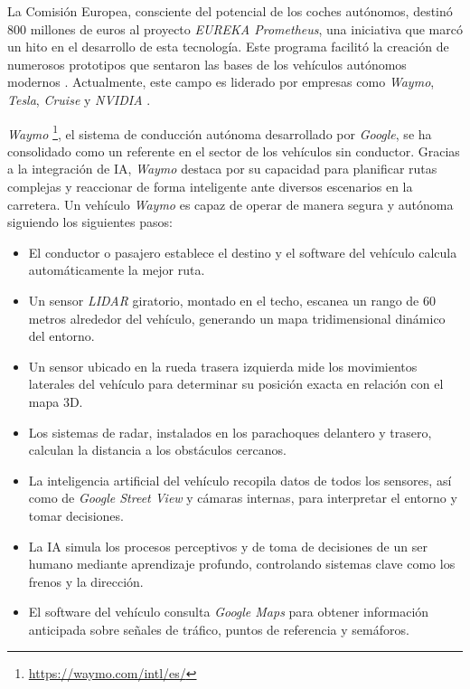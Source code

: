 La Comisión Europea, consciente del potencial de los coches autónomos, destinó 800 millones de euros al proyecto  \textit{EUREKA Prometheus}, una iniciativa que marcó un hito en el desarrollo de esta tecnología. Este programa facilitó la creación de numerosos prototipos que sentaron las bases de los vehículos autónomos modernos  \cite{history-vehicles}. Actualmente, este campo es liderado por empresas como  \textit{Waymo},  \textit{Tesla},  \textit{Cruise} y  \textit{NVIDIA } \cite{ai-self-driving-cars}.

\textit{Waymo} \footnote{\url{https://waymo.com/intl/es/}}, el sistema de conducción autónoma desarrollado por \textit{Google}, se ha consolidado como un referente en el sector de los vehículos sin conductor. Gracias a la integración de \ac{IA}, \textit{Waymo} destaca por su capacidad para planificar rutas complejas y reaccionar de forma inteligente ante diversos escenarios en la carretera. Un vehículo \textit{Waymo} es capaz de operar de manera segura y autónoma siguiendo los siguientes pasos:

\begin{itemize}
    \item El conductor o pasajero establece el destino y el software del vehículo calcula automáticamente la mejor ruta.
    \item Un sensor \textit{LIDAR} giratorio, montado en el techo, escanea un rango de 60 metros alrededor del vehículo, generando un mapa tridimensional dinámico del entorno.
    \item Un sensor ubicado en la rueda trasera izquierda mide los movimientos laterales del vehículo para determinar su posición exacta en relación con el mapa 3D.
    \item Los sistemas de radar, instalados en los parachoques delantero y trasero, calculan la distancia a los obstáculos cercanos.
    \item La inteligencia artificial del vehículo recopila datos de todos los sensores, así como de \textit{Google Street View} y cámaras internas, para interpretar el entorno y tomar decisiones.
    \item La \ac{IA} simula los procesos perceptivos y de toma de decisiones de un ser humano mediante aprendizaje profundo, controlando sistemas clave como los frenos y la dirección.
    \item El software del vehículo consulta \textit{Google Maps} para obtener información anticipada sobre señales de tráfico, puntos de referencia y semáforos.
\end{itemize}

